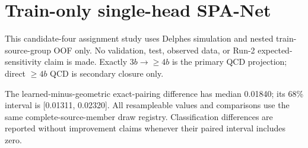 \section{Train-only single-head SPA-Net}
This candidate-four assignment study uses Delphes simulation and nested train-source-group OOF only. No validation, test, observed data, or Run-2 expected-sensitivity claim is made. Exactly $3b\rightarrow{\geq4b}$ is the primary QCD projection; direct $\geq4b$ QCD is secondary closure only.

The learned-minus-geometric exact-pairing difference has median 0.01840; its 68\% interval is [0.01311, 0.02320]. All resampleable values and comparisons use the same complete-source-member draw registry. Classification differences are reported without improvement claims whenever their paired interval includes zero.\par\medskip
